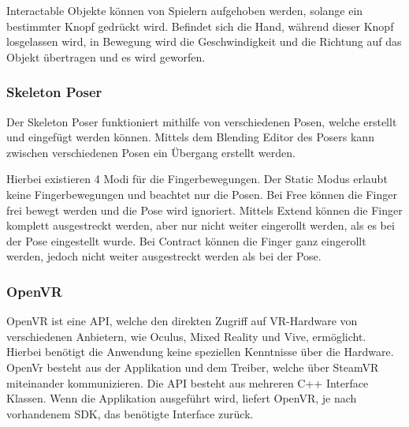 Interactable Objekte können von Spielern aufgehoben werden, solange ein bestimmter Knopf gedrückt wird.
Befindet sich die Hand, während dieser Knopf losgelassen wird, in Bewegung wird die Geschwindigkeit und die Richtung auf das Objekt übertragen und es wird geworfen.
~\cite{SteamVR_Interaction_System_2022}

\subsubsection{Skeleton Poser}
Der Skeleton Poser funktioniert mithilfe von verschiedenen Posen, welche erstellt und eingefügt werden können.
Mittels dem Blending Editor des Posers kann zwischen verschiedenen Posen ein Übergang erstellt werden.

Hierbei existieren 4 Modi für die Fingerbewegungen.
Der Static Modus erlaubt keine Fingerbewegungen und beachtet nur die Posen.
Bei Free können die Finger frei bewegt werden und die Pose wird ignoriert.
Mittels Extend können die Finger komplett ausgestreckt werden, aber nur nicht weiter eingerollt werden, als es bei der Pose eingestellt wurde.
Bei Contract können die Finger ganz eingerollt werden, jedoch nicht weiter ausgestreckt werden als bei der Pose.
~\cite{SteamVR_Skeleton_Poser_2022}

\subsubsection{OpenVR}
OpenVR ist eine API, welche den direkten Zugriff auf VR-Hardware von verschiedenen Anbietern, wie Oculus, Mixed Reality und Vive, ermöglicht.
Hierbei benötigt die Anwendung keine speziellen Kenntnisse über die Hardware.
OpenVr besteht aus der Applikation und dem Treiber, welche über SteamVR miteinander kommunizieren.
Die API besteht aus mehreren C++ Interface Klassen.
Wenn die Applikation ausgeführt wird, liefert OpenVR, je nach vorhandenem SDK, das benötigte Interface zurück.
~\cite{OpenVR_Github_Documentation_2020}


